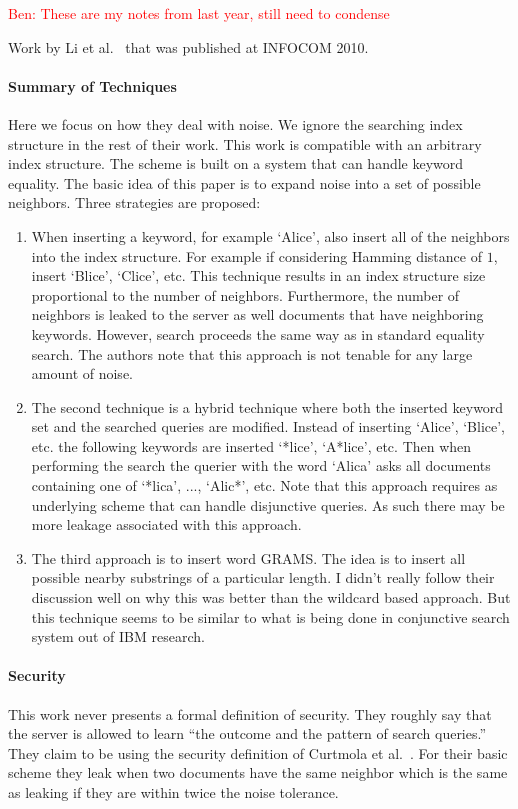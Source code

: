 \documentclass[11pt]{article}
\newcommand{\ben}[1]{\textcolor{red}{Ben: #1}}
\theoremstyle{remark}
\begin{document}
\ben{These are my notes from last year, still need to condense}

Work by Li et al.~\cite{li2010fuzzy,wang2013efficient} that was published at INFOCOM 2010.  

\paragraph{Summary of Techniques}  Here we focus on how they deal with noise.  We ignore the searching index structure in the rest of their work.  This work is compatible with an arbitrary index structure.  The scheme is built on a system that can handle keyword equality.  The basic idea of this paper is to expand noise into a set of possible neighbors.  Three strategies are proposed:

\begin{enumerate}
\item When inserting a keyword, for example `Alice', also insert all of the neighbors into the index structure.  For example if considering Hamming distance of $1$, insert `Blice', `Clice', etc.  This technique results in an index structure size proportional to the number of neighbors.  Furthermore, the number of neighbors is leaked to the server as well documents that have neighboring keywords.  However, search proceeds the same way as in standard equality search.  The authors note that this approach is not tenable for any large amount of noise.
\item The second technique is a hybrid technique where both the inserted keyword set and the searched queries are modified.  Instead of inserting `Alice', `Blice', etc. the following keywords are inserted `*lice', `A*lice', etc.  Then when performing the search the querier with the word `Alica' asks all documents containing one of `*lica', ..., `Alic*', etc.  Note that this approach requires as underlying scheme that can handle disjunctive queries.  As such there may be more leakage associated with this approach.
\item The third approach is to insert word GRAMS.  The idea is to insert all possible nearby substrings of a particular length.  I didn't really follow their discussion well on why this was better than the wildcard based approach.  But this technique seems to be similar to what is being done in conjunctive search system out of IBM research.
\end{enumerate}

\paragraph{Security}
This work never presents a formal definition of security.  They roughly say that the server is allowed to learn ``the outcome and the pattern of search queries.''  They claim to be using the security definition of Curtmola et al.~\cite{curtmola2011searchable}.  For their basic scheme they leak when two documents have the same neighbor which is the same as leaking if they are within twice the noise tolerance.  
\end{document}
